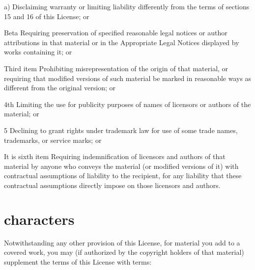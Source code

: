 \documentclass{article}
\begin{document}
\begin{Rpolylist}[fourth]

\item[a)] Disclaiming warranty or limiting liability differently from the terms of sections 15 and 16 of this License; or

\item[Beta] Requiring preservation of specified reasonable legal notices or author attributions in that material or in the Appropriate Legal Notices displayed by works containing it; or

\item[Third item] Prohibiting misrepresentation of the origin of that material, or requiring that modified versions of such material be marked in reasonable ways as different from the original version; or

\item[4th] Limiting the use for publicity purposes of names of licensors or authors of the material; or

\item[5] Declining to grant rights under trademark law for use of some trade names, trademarks, or service marks; or

\item[It is sixth item] Requiring indemnification of licensors and authors of that material by anyone who conveys the material (or modified versions of it) with contractual assumptions of liability to the recipient, for any liability that these contractual assumptions directly impose on those licensors and authors.

\end{Rpolylist}

\section{characters}

Notwithstanding any other provision of this License, for material you add to a covered work, you may (if authorized by the copyright holders of that material) supplement the terms of this License with terms:
\end{document}
